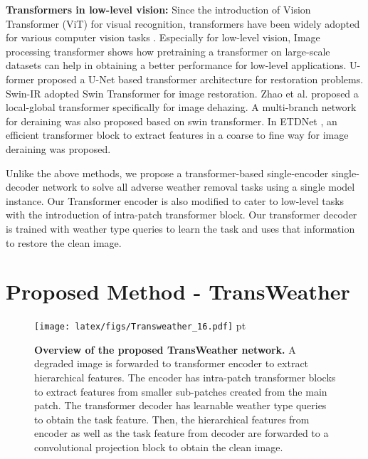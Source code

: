 \documentclass[10pt,twocolumn,letterpaper]{article}
\begin{document}
\noindent  \textbf{Transformers in low-level vision:} Since the introduction of Vision Transformer (ViT) \cite{dosovitskiy2020image} for visual recognition, transformers have been widely adopted for various computer vision tasks \cite{zheng2021rethinking, jose2021medical, yang2021transpose, guo2021pct, liu2021video}. Especially for low-level vision, Image processing transformer \cite{chen2021pre} shows how pretraining a transformer on large-scale datasets can help in obtaining a better performance for low-level applications. U-former \cite{wang2021uformer} proposed a U-Net based transformer architecture for restoration problems. Swin-IR \cite{liang2021swinir} adopted Swin Transformer \cite{liu2021swin} for image restoration. Zhao et al. \cite{zhao2021hybrid} proposed a local-global transformer specifically for image dehazing. A multi-branch network \cite{tan2021sdnet} for deraining was also proposed based on swin transformer. In ETDNet \cite{qin2021etdnet}, an efficient transformer block to extract features in a coarse to fine way for image deraining was proposed.

Unlike the above methods, we propose a transformer-based single-encoder single-decoder network to solve all adverse weather removal tasks using a single model instance. Our Transformer encoder is also modified to cater to low-level tasks with the introduction of intra-patch transformer block. Our transformer decoder is trained with weather type queries to learn the task and uses that information to restore the clean image. 



\section{Proposed Method -  TransWeather}

\begin{figure*}[]
	\centering
	\texttt{[image: latex/figs/Transweather\_16.pdf]}
	 pt
	\caption{\textbf{Overview of the proposed TransWeather network.} A degraded image is forwarded to transformer encoder to extract hierarchical features. The encoder has intra-patch transformer blocks to extract features from smaller sub-patches created from the main patch. The transformer decoder has learnable weather type queries to obtain the task feature. Then, the hierarchical features from encoder as well as the task feature from decoder are forwarded to a convolutional projection block to obtain the clean image. }  
	\label{arch}
	\vspace{-1.8em}
\end{figure*}
\end{document}

